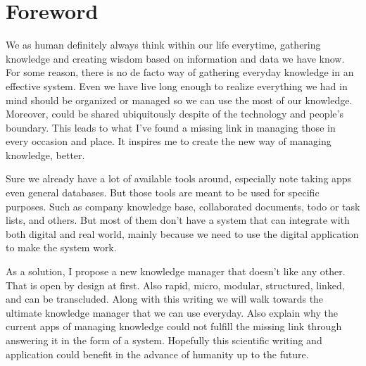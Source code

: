 \begingroup
\let\clearpage\relax
\let\cleardoublepage\relax

\chapter{Foreword}
\label{chap:foreword}

We as human definitely always think within our life everytime, gathering knowledge and creating wisdom based on information and data we have know. For some reason, there is no de facto way of gathering everyday knowledge in an effective system. Even we have live long enough to realize everything we had in mind should be organized or managed so we can use the most of our knowledge. Moreover, could be shared ubiquitously despite of the technology and people's boundary. This leads to what I've found a missing link in managing those in every occasion and place. It inspires me to create the new way of managing knowledge, better.

Sure we already have a lot of available tools around, especially note taking apps even general databases. But those tools are meant to be used for specific purposes. Such as company knowledge base, collaborated documents, todo or task lists, and others. But most of them don't have a system that can integrate with both digital and real world, mainly because we need to use the digital application to make the system work.

As a solution, I propose a new knowledge manager that doesn't like any other. That is open by design at first. Also rapid, micro, modular, structured, linked, and can be transcluded. Along with this writing we will walk towards the ultimate knowledge manager that we can use everyday. Also explain why the current apps of managing knowledge could not fulfill the missing link through answering it in the form of a system. Hopefully this scientific writing and application could benefit in the advance of humanity up to the future.

\endgroup

